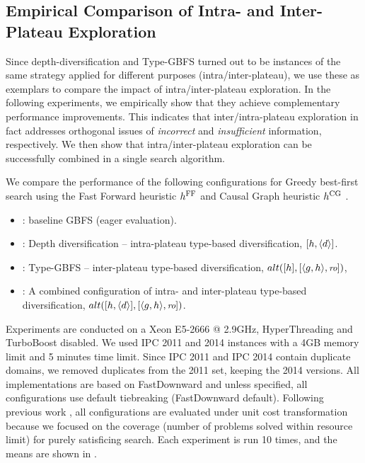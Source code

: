 
\subsection{Empirical Comparison of Intra- and Inter-Plateau Exploration}
\label{sec:gbfs-comparison}


Since depth-diversification and Type-GBFS turned out to be instances of the same strategy applied for different purposes
(intra/inter-plateau), we use these as exemplars to compare the impact of intra/inter-plateau exploration.
In the following experiments, we empirically show that they achieve complementary performance improvements.
This indicates that inter/intra-plateau exploration in fact addresses orthogonal issues of \emph{incorrect} and \emph{insufficient} information, respectively.
We then show that intra/inter-plateau exploration can be successfully combined in a single search algorithm.

We compare the performance of the following configurations for Greedy best-first search using the Fast Forward heuristic $\text{$h^\text{FF}$}$ \cite{hoffmann01} and Causal Graph heuristic $\text{$h^\text{CG}$}$ \cite{Helmert04}.
\begin{itemize}
\item {}: baseline GBFS (eager evaluation).
\item {}: Depth diversification \cite{Asai2016} -- intra-plateau type-based diversification, $[h,{\left<d\right>}]$.
\item {}: Type-GBFS \cite{xie14type} -- inter-plateau type-based diversification,  $alt([h],[{\left<g,h\right>},{\small\textit{ro}}])$,
\item  {}: A combined configuration of intra- and inter-plateau type-based diversification, $alt([h,{\left<d\right>}],[{\left<g,h\right>},{\small\textit{ro}}])$.
\end{itemize}

Experiments are conducted on a Xeon E5-2666 @ 2.9GHz, HyperThreading and TurboBoost disabled.
We used IPC 2011 and 2014 instances with a 4GB memory limit and 5 minutes time limit. Since IPC 2011 and IPC 2014 contain duplicate domains, we removed duplicates from the 2011 set, keeping the 2014 versions.
All implementations are based on FastDownward \cite{Helmert2006} and
unless specified, all configurations use \fifo default tiebreaking (FastDownward default).
% 
Following previous work \cite{valenzano2014comparison,xie14type}, all configurations are evaluated under unit cost transformation
because we focused on the coverage (number of problems solved within resource limit) for purely satisficing search. 
Each experiment is run 10 times, and the means are shown in .

